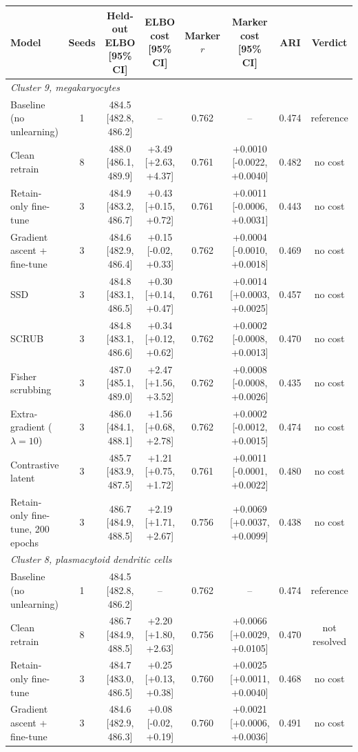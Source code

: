 \begin{tabular}{lccccccc}
\toprule
Model & Seeds & Held-out ELBO [95\% CI] & ELBO cost [95\% CI] & Marker $r$ & Marker cost [95\% CI] & ARI & Verdict \\
\midrule
\multicolumn{8}{l}{\emph{Cluster 9, megakaryocytes}} \\
Baseline (no unlearning) & 1 & 484.5 [482.8, 486.2] & -- & 0.762 & -- & 0.474 & reference \\
Clean retrain & 8 & 488.0 [486.1, 489.9] & +3.49 [+2.63, +4.37] & 0.761 & +0.0010 [-0.0022, +0.0040] & 0.482 & no cost \\
Retain-only fine-tune & 3 & 484.9 [483.2, 486.7] & +0.43 [+0.15, +0.72] & 0.761 & +0.0011 [-0.0006, +0.0031] & 0.443 & no cost \\
Gradient ascent + fine-tune & 3 & 484.6 [482.9, 486.4] & +0.15 [-0.02, +0.33] & 0.762 & +0.0004 [-0.0010, +0.0018] & 0.469 & no cost \\
SSD & 3 & 484.8 [483.1, 486.5] & +0.30 [+0.14, +0.47] & 0.761 & +0.0014 [+0.0003, +0.0025] & 0.457 & no cost \\
SCRUB & 3 & 484.8 [483.1, 486.6] & +0.34 [+0.12, +0.62] & 0.762 & +0.0002 [-0.0008, +0.0013] & 0.470 & no cost \\
Fisher scrubbing & 3 & 487.0 [485.1, 489.0] & +2.47 [+1.56, +3.52] & 0.762 & +0.0008 [-0.0008, +0.0026] & 0.435 & no cost \\
Extra-gradient ($\lambda=10$) & 3 & 486.0 [484.1, 488.1] & +1.56 [+0.68, +2.78] & 0.762 & +0.0002 [-0.0012, +0.0015] & 0.474 & no cost \\
Contrastive latent & 3 & 485.7 [483.9, 487.5] & +1.21 [+0.75, +1.72] & 0.761 & +0.0011 [-0.0001, +0.0022] & 0.480 & no cost \\
Retain-only fine-tune, 200 epochs & 3 & 486.7 [484.9, 488.5] & +2.19 [+1.71, +2.67] & 0.756 & +0.0069 [+0.0037, +0.0099] & 0.438 & no cost \\
\midrule
\multicolumn{8}{l}{\emph{Cluster 8, plasmacytoid dendritic cells}} \\
Baseline (no unlearning) & 1 & 484.5 [482.8, 486.2] & -- & 0.762 & -- & 0.474 & reference \\
Clean retrain & 8 & 486.7 [484.9, 488.5] & +2.20 [+1.80, +2.63] & 0.756 & +0.0066 [+0.0029, +0.0105] & 0.470 & not resolved \\
Retain-only fine-tune & 3 & 484.7 [483.0, 486.5] & +0.25 [+0.13, +0.38] & 0.760 & +0.0025 [+0.0011, +0.0040] & 0.468 & no cost \\
Gradient ascent + fine-tune & 3 & 484.6 [482.9, 486.3] & +0.08 [-0.02, +0.19] & 0.760 & +0.0021 [+0.0006, +0.0036] & 0.491 & no cost \\

\end{tabular}
